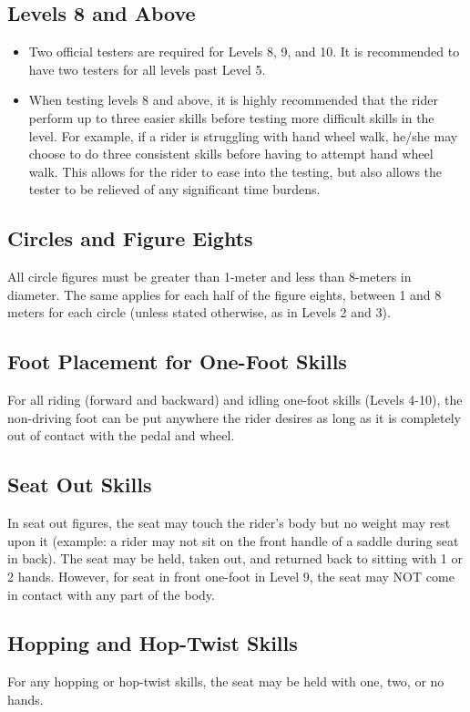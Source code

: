 \subsection{ Levels 8 and Above}
\begin{itemize}
\item Two official testers are required for Levels 8, 9, and 10. It is recommended to have two testers for all levels past
Level 5.
\item When testing levels 8 and above, it is highly recommended that the rider perform up to three easier skills before
testing more difficult skills in the level. For example, if a rider is struggling with hand wheel walk, he/she may
choose to do three consistent skills before having to attempt hand wheel walk. This allows for the rider to ease
into the testing, but also allows the tester to be relieved of any significant time burdens.
\end{itemize}

\subsection{ Circles and Figure Eights}
All circle figures must be greater than 1-meter and less than 8-meters in diameter. The same applies for each half of the
figure eights, between 1 and 8 meters for each circle (unless stated otherwise, as in Levels 2 and 3).
\subsection{Foot Placement for One-Foot Skills}
For all riding (forward and backward) and idling one-foot skills (Levels 4-10), the non-driving foot can be put
anywhere the rider desires as long as it is completely out of contact with the pedal and wheel.

\subsection{ Seat Out Skills}
In seat out figures, the seat may touch the rider's body but no weight may rest upon it (example: a rider may not sit on
the front handle of a saddle during seat in back). The seat may be held, taken out, and returned back to sitting with 1 or
2 hands. However, for seat in front one-foot in Level 9, the seat may NOT come in contact with any part of the body.

\subsection{ Hopping and Hop-Twist Skills}
For any hopping or hop-twist skills, the seat may be held with one, two, or no hands.

